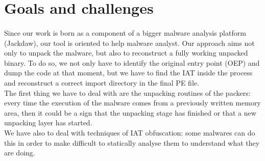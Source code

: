 \section{Goals and challenges}
\paragraph{}
Since our work is born as a component of a bigger malware analysis platform (Jackdaw), our tool is oriented to help malware analyst. 
Our approach aims not only to unpack the malware, but also to reconstruct a fully working unpacked binary. To do so, we not only have to identify the original entry point (OEP) and dump the code at that moment, but we have to find the IAT inside the process and reconstruct a correct import directory in the final PE file.\\
The first thing we have to deal with are the unpacking routines of the packers: every time the execution of the malware comes from a previously written memory area, then it could be a sign that the unpacking stage has finished or that a new unpacking layer has started.\\
We have also to deal with techniques of IAT obfuscation: some malwares can do this in order to make difficult to statically analyse them to understand what they are doing.

